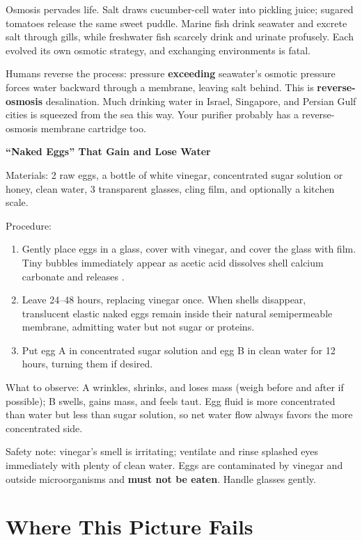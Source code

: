 Osmosis pervades life. Salt draws cucumber-cell water into pickling juice; sugared tomatoes release the same sweet puddle. Marine fish drink seawater and excrete salt through gills, while freshwater fish scarcely drink and urinate profusely. Each evolved its own osmotic strategy, and exchanging environments is fatal.

Humans reverse the process: pressure \textbf{exceeding} seawater's osmotic pressure forces water backward through a membrane, leaving salt behind. This is \textbf{reverse-osmosis} desalination. Much drinking water in Israel, Singapore, and Persian Gulf cities is squeezed from the sea this way. Your purifier probably has a reverse-osmosis membrane cartridge too.

\begin{shiyan}
\textbf{``Naked Eggs'' That Gain and Lose Water}

Materials: 2 raw eggs, a bottle of white vinegar, concentrated sugar solution or honey, clean water, 3 transparent glasses, cling film, and optionally a kitchen scale.

Procedure:
\begin{enumerate}[itemsep=2pt]
\item Gently place eggs in a glass, cover with vinegar, and cover the glass with film. Tiny bubbles immediately appear as acetic acid dissolves shell calcium carbonate and releases .
\item Leave 24--48 hours, replacing vinegar once. When shells disappear, translucent elastic naked eggs remain inside their natural semipermeable membrane, admitting water but not sugar or proteins.
\item Put egg A in concentrated sugar solution and egg B in clean water for 12 hours, turning them if desired.
\end{enumerate}

What to observe: A wrinkles, shrinks, and loses mass (weigh before and after if possible); B swells, gains mass, and feels taut. Egg fluid is more concentrated than water but less than sugar solution, so net water flow always favors the more concentrated side.

Safety note: vinegar's smell is irritating; ventilate and rinse splashed eyes immediately with plenty of clean water. Eggs are contaminated by vinegar and outside microorganisms and \textbf{must not be eaten}. Handle glasses gently.
\end{shiyan}

\section{Where This Picture Fails}

